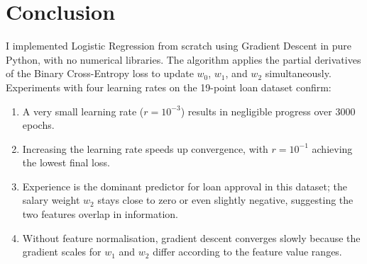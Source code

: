 \documentclass[12pt,a4paper]{article}
\begin{document}
\section{Conclusion}

I implemented Logistic Regression from scratch using Gradient Descent in pure Python, with no numerical libraries. The algorithm applies the partial derivatives of the Binary Cross-Entropy loss to update $w_0$, $w_1$, and $w_2$ simultaneously. Experiments with four learning rates on the 19-point loan dataset confirm:
\begin{enumerate}
    \item A very small learning rate ($r = 10^{-3}$) results in negligible progress over 3000 epochs.
    \item Increasing the learning rate speeds up convergence, with $r = 10^{-1}$ achieving the lowest final loss.
    \item Experience is the dominant predictor for loan approval in this dataset; the salary weight $w_2$ stays close to zero or even slightly negative, suggesting the two features overlap in information.
    \item Without feature normalisation, gradient descent converges slowly because the gradient scales for $w_1$ and $w_2$ differ according to the feature value ranges.
\end{enumerate}
\end{document}
